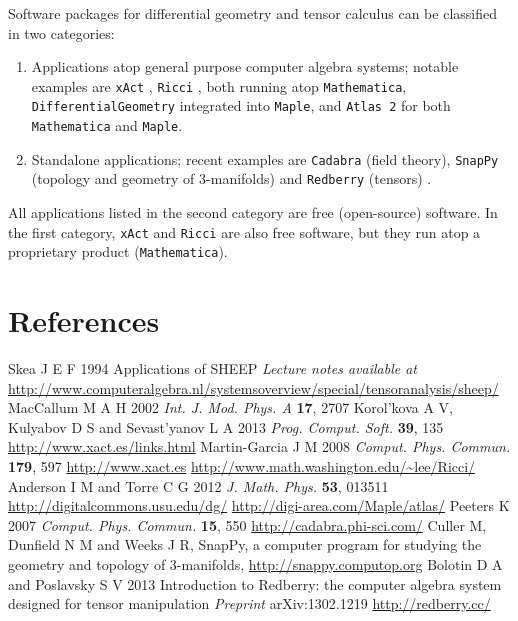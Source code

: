 \documentclass[a4paper]{jpconf}
\newcommand{\soft}[1]{\texttt{#1}}
\begin{document}
Software packages for differential geometry and tensor calculus can be 
classified in two categories: 
\begin{enumerate}
\item Applications atop general purpose computer algebra systems; 
notable examples are 
\soft{xAct} \cite{Marti08,xAct}, \soft{Ricci} \cite{Ricci}, both
running atop \soft{Mathematica},
\soft{DifferentialGeometry} \cite{AnderT12,DiffGeom} integrated into \soft{Maple}, and \soft{Atlas 2}
\cite{Atlas2} for both \soft{Mathematica} and \soft{Maple}.
\item Standalone applications; recent examples are \soft{Cadabra} \cite{Peete07,Cadabra} (field theory),
\soft{SnapPy} \cite{SnapPy} (topology and geometry of 3-manifolds) and
\soft{Redberry} (tensors) \cite{BolotP13,Redberry}.
\end{enumerate}
All applications listed in the second category are free (open-source) software. In
the first category, \soft{xAct} and \soft{Ricci} are also free software, but
they run atop a proprietary product (\soft{Mathematica}). 




\section*{References}
\begin{thebibliography}{10}
Skea J E F 1994 Applications of SHEEP {\it Lecture notes available at}
\url{
http://www.computeralgebra.nl/systemsoverview/special/tensoranalysis/sheep/}
MacCallum M A H 2002 {\it Int. J. Mod. Phys. A} {\bf 17}, 2707 
Korol'kova A V, Kulyabov D S and Sevast'yanov L A 2013 {\it Prog. Comput. Soft.} 
{\bf 39}, 135
\url{http://www.xact.es/links.html}
Martin-Garcia J M 2008 {\it Comput. Phys. Commun.} {\bf 179}, 597
\url{http://www.xact.es}
\url{http://www.math.washington.edu/~lee/Ricci/}
Anderson I M and Torre C G 2012 {\it J. Math. Phys.} {\bf 53}, 013511
\url{http://digitalcommons.usu.edu/dg/}
\url{http://digi-area.com/Maple/atlas/}
Peeters K 2007 {\it Comput. Phys. Commun.} {\bf 15}, 550
\url{http://cadabra.phi-sci.com/}
Culler M, Dunfield N M and Weeks J R, SnapPy, a computer program for studying the geometry and topology of 3-manifolds, \url{http://snappy.computop.org}
Bolotin D A and Poslavsky S V 2013 Introduction to Redberry: the computer algebra system designed for tensor manipulation {\it Preprint} arXiv:1302.1219
\url{http://redberry.cc/}

\end{thebibliography}
\end{document}
